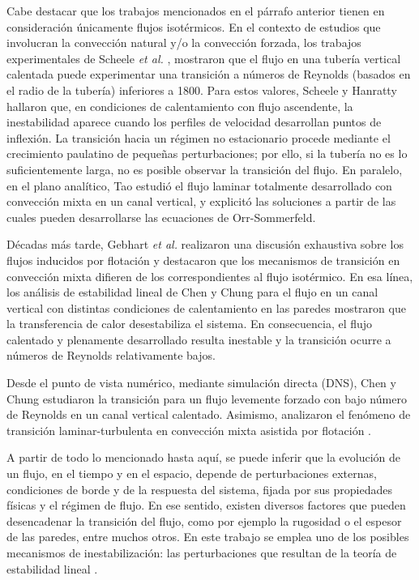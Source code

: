 Cabe destacar que los trabajos mencionados en el párrafo anterior tienen en consideración únicamente flujos isotérmicos. En el contexto de estudios que involucran la convección natural y/o la convección forzada, los trabajos experimentales de Scheele \textit{et al.}  \cite{scheele1960effect}, \cite{scheele1962effect} mostraron que el flujo en una tubería vertical calentada puede experimentar una transición a números de Reynolds (basados en el radio de la tubería) inferiores a 1800. Para estos valores, Scheele y \linebreak  Hanratty \cite{scheele1962effect} hallaron que, en condiciones de calentamiento con flujo ascendente, la inestabilidad aparece cuando los perfiles de velocidad \linebreak  desarrollan puntos de inflexión. La transición hacia un régimen no estacionario procede mediante el crecimiento paulatino de pequeñas perturbaciones; por ello, si la tubería no es lo suficientemente larga, no es posible observar la transición del flujo. En paralelo, en el plano analítico, Tao \cite{tao1960} estudió el flujo laminar totalmente desarrollado con convección mixta en un canal vertical, y explicitó las soluciones a partir de las cuales pueden desarrollarse las ecuaciones de Orr-Sommerfeld.

Décadas más tarde, Gebhart \textit{et al.} \cite{gebhart1989buoyancy} realizaron una discusión exhaustiva sobre los flujos inducidos por flotación y destacaron que los mecanismos de transición en convección mixta difieren de los correspondientes al flujo isotérmico. En esa línea, los análisis de estabilidad lineal de Chen y Chung para el flujo en un canal vertical con distintas condiciones de calentamiento en las paredes \cite{chen1996linear,chen1998stability} mostraron que la transferencia de calor desestabiliza el sistema. En consecuencia, el flujo calentado y plenamente desarrollado resulta inestable y la transición ocurre a números de Reynolds relativamente bajos.

Desde el punto de vista numérico, mediante simulación directa (DNS), Chen y Chung \cite{chen2002direct} estudiaron la transición para un flujo levemente forzado con bajo número de Reynolds en un canal vertical calentado. Asimismo, analizaron el fenómeno de transición laminar-turbulenta en convección mixta asistida por flotación \cite{chen2003direct}.

A partir de todo lo mencionado hasta aquí, se puede inferir que la evolución de un flujo, en el tiempo y en el espacio, depende de perturbaciones externas, condiciones de borde y de la respuesta del sistema, fijada por sus propiedades físicas y el régimen de flujo. En ese sentido, existen diversos factores que pueden desencadenar la transición del flujo, como por ejemplo la rugosidad o el espesor de las paredes, entre muchos otros. En este trabajo se emplea uno de los posibles mecanismos de inestabilización: las perturbaciones que resultan de la teoría de estabilidad lineal \cite{schmid}. 

